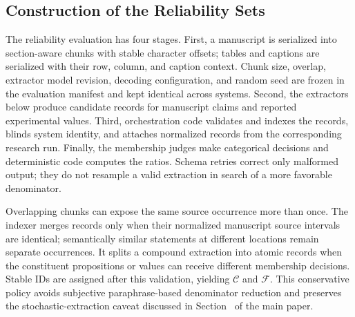 \subsection{Construction of the Reliability Sets}

The reliability evaluation has four stages. First, a manuscript is serialized
into section-aware chunks with stable character offsets; tables and captions
are serialized with their row, column, and caption context. Chunk size,
overlap, extractor model revision, decoding configuration, and random seed are
frozen in the evaluation manifest and kept identical across systems. Second,
the extractors below produce candidate records for manuscript claims and
reported experimental values. Third, orchestration code validates and indexes
the records, blinds system identity, and attaches normalized records from the
corresponding research run. Finally, the membership judges make categorical
decisions and deterministic code computes the ratios. Schema retries correct
only malformed output; they do not resample a valid extraction in search of a
more favorable denominator.

Overlapping chunks can expose the same source occurrence more than once. The
indexer merges records only when their normalized manuscript source intervals
are identical; semantically similar statements at different locations remain
separate occurrences. It splits a compound extraction into atomic records when
the constituent propositions or values can receive different membership
decisions. Stable IDs are assigned after this validation, yielding
$\mathcal{C}$ and $\mathcal{F}$. This conservative policy avoids subjective
paraphrase-based denominator reduction and preserves the stochastic-extraction
caveat discussed in Section~ of the main paper.

